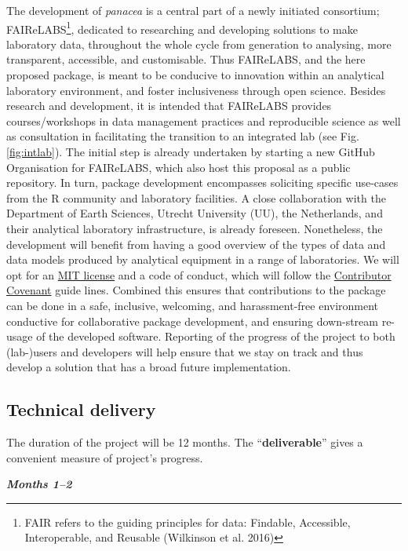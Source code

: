 \documentclass[]{article}
\begin{document}
The development of \emph{panacea} is a central part of a newly initiated consortium; FAIReLABS\footnote{FAIR refers to the guiding principles for data: Findable, Accessible, Interoperable, and Reusable (Wilkinson et al. 2016)}, dedicated to researching and developing solutions to make laboratory data, throughout the whole cycle from generation to analysing, more transparent, accessible, and customisable. Thus FAIReLABS, and the here proposed package, is meant to be conducive to innovation within an analytical laboratory environment, and foster inclusiveness through open science. Besides research and development, it is intended that FAIReLABS provides courses/workshops in data management practices and reproducible science as well as consultation in facilitating the transition to an integrated lab (see Fig. \ref{fig:intlab}). The initial step is already undertaken by starting a new GitHub Organisation for FAIReLABS, which also host this proposal as a public repository. In turn, package development encompasses soliciting specific use-cases from the R community and laboratory facilities. A close collaboration with the Department of Earth Sciences, Utrecht University (UU), the Netherlands, and their analytical laboratory infrastructure, is already foreseen. Nonetheless, the development will benefit from having a good overview of the types of data and data models produced by analytical equipment in a range of laboratories. We will opt for an \href{https://opensource.org/licenses/MIT}{MIT license} and a code of conduct, which will follow the \href{https://www.contributor-covenant.org/}{Contributor Covenant} guide lines. Combined this ensures that contributions to the package can be done in a safe, inclusive, welcoming, and harassment-free environment conductive for collaborative package development, and ensuring down-stream re-usage of the developed software. Reporting of the progress of the project to both (lab-)users and developers will help ensure that we stay on track and thus develop a solution that has a broad future implementation.

\hypertarget{sec:Technical}{%
\subsection{Technical delivery}\label{sec:Technical}}

The duration of the project will be 12 months. The ``\textbf{deliverable}'' gives a convenient measure of project's progress.

\textbf{\emph{Months 1--2}}
\end{document}
